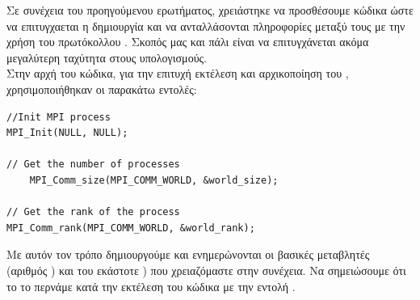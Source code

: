 \documentclass{article}
\begin{document}
Σε συνέχεια του προηγούμενου ερωτήματος, χρειάστηκε να προσθέσουμε κώδικα ώστε να επιτυγχαεται η δημιουργία  και να ανταλλάσονται πληροφορίες μεταξύ τους με την χρήση του πρωτόκολλου  . Σκοπός μας και πάλι είναι να επιτυγχάνεται ακόμα μεγαλύτερη ταχύτητα στους υπολογισμούς.\\

Στην αρχή του κώδικα, για την επιτυχή εκτέλεση και αρχικοποίηση του , χρησιμοποιήθηκαν οι παρακάτω εντολές:

\begin{lstlisting}
//Init MPI process
MPI_Init(NULL, NULL);
 
// Get the number of processes
    MPI_Comm_size(MPI_COMM_WORLD, &world_size);

// Get the rank of the process
MPI_Comm_rank(MPI_COMM_WORLD, &world_rank);
\end{lstlisting}

Με αυτόν τον τρόπο δημιουργούμε  και ενημερώνονται οι βασικές μεταβλητές (αριθμός ) και  του εκάστοτε ) που χρειαζόμαστε στην συνέχεια.  Να σημειώσουμε ότι το  το περνάμε κατά την εκτέλεση του κώδικα με την εντολή .\\
\end{document}
